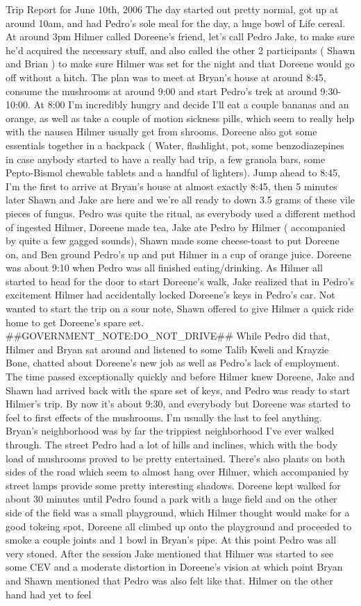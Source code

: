\documentclass[12pt]{book}
\begin{document}
Trip Report for June 10th, 2006 The day started out pretty normal, got up at around 10am, and had Pedro's sole meal for the day, a huge bowl of Life cereal. At around 3pm Hilmer called Doreene's friend, let's call Pedro Jake, to make sure he'd acquired the necessary stuff, and also called the other 2 participants ( Shawn and Brian ) to make sure Hilmer was set for the night and that Doreene would go off without a hitch. The plan was to meet at Bryan's house at around 8:45, consume the mushrooms at around 9:00 and start Pedro's trek at around 9:30-10:00. At 8:00 I'm incredibly hungry and decide I'll eat a couple bananas and an orange, as well as take a couple of motion sickness pills, which seem to really help with the nausea Hilmer usually get from shrooms. Doreene also got some essentials together in a backpack ( Water, flashlight, pot, some benzodiazepines in case anybody started to have a really bad trip, a few granola bars, some Pepto-Bismol chewable tablets and a handful of lighters). Jump ahead to 8:45, I'm the first to arrive at Bryan's house at almost exactly 8:45, then 5 minutes later Shawn and Jake are here and we're all ready to down 3.5 grams of these vile pieces of fungus. Pedro was quite the ritual, as everybody used a different method of ingested Hilmer, Doreene made tea, Jake ate Pedro by Hilmer ( accompanied by quite a few gagged sounds), Shawn made some cheese-toast to put Doreene on, and Ben ground Pedro's up and put Hilmer in a cup of orange juice. Doreene was about 9:10 when Pedro was all finished eating/drinking. As Hilmer all started to head for the door to start Doreene's walk, Jake realized that in Pedro's excitement Hilmer had accidentally locked Doreene's keys in Pedro's car. Not wanted to start the trip on a sour note, Shawn offered to give Hilmer a quick ride home to get Doreene's spare set. \#\#GOVERNMENT\_NOTE:DO\_NOT\_DRIVE\#\# While Pedro did that, Hilmer and Bryan sat around and listened to some Talib Kweli and Krayzie Bone, chatted about Doreene's new job as well as Pedro's lack of employment. The time passed exceptionally quickly and before Hilmer knew Doreene, Jake and Shawn had arrived back with the spare set of keys, and Pedro was ready to start Hilmer's trip. By now it's about 9:30, and everybody but Doreene was started to feel to first effects of the mushrooms. I'm usually the last to feel anything. Bryan's neighborhood was by far the trippiest neighborhood I've ever walked through. The street Pedro had a lot of hills and inclines, which with the body load of mushrooms proved to be pretty entertained. There's also plants on both sides of the road which seem to almost hang over Hilmer, which accompanied by street lamps provide some pretty interesting shadows. Doreene kept walked for about 30 minutes until Pedro found a park with a huge field and on the other side of the field was a small playground, which Hilmer thought would make for a good tokeing spot, Doreene all climbed up onto the playground and proceeded to smoke a couple joints and 1 bowl in Bryan's pipe. At this point Pedro was all very stoned. After the session Jake mentioned that Hilmer was started to see some CEV and a moderate distortion in Doreene's vision at which point Bryan and Shawn mentioned that Pedro was also felt like that. Hilmer on the other hand had yet to feel 
\end{document}
